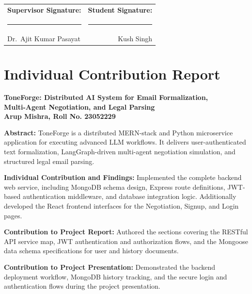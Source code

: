 \documentclass[12pt,a4paper]{report}
\begin{document}
\vspace{2cm}
\noindent
\begin{tabular*}{\textwidth}{@{\extracolsep{\fill}}lr}
	\textbf{Supervisor Signature:} & \textbf{Student Signature:} \\[1.8cm]
	\rule{6cm}{0.4pt} & \rule{6cm}{0.4pt} \\
	Dr.\ Ajit Kumar Pasayat & Kush Singh \\
\end{tabular*}

\clearpage
\chapter*{Individual Contribution Report}
\begin{center}
	{\large \textbf{ToneForge: Distributed AI System for Email Formalization,\\Multi-Agent Negotiation, and Legal Parsing}}\\[0.5cm]
	{\large \textbf{Arup Mishra, Roll No. 23052229}}\\[0.2cm]
\end{center}

\vspace{0.5cm}
\noindent \textbf{Abstract:}
ToneForge is a distributed MERN-stack and Python microservice application for executing advanced LLM workflows. It delivers user-authenticated text formalization, LangGraph-driven multi-agent negotiation simulation, and structured legal email parsing.

\vspace{0.5cm}
\noindent \textbf{Individual Contribution and Findings:}
Implemented the complete backend web service, including MongoDB schema design, Express route definitions, JWT-based authentication middleware, and database integration logic. Additionally developed the React frontend interfaces for the Negotiation, Signup, and Login pages.

\vspace{0.5cm}
\noindent \textbf{Contribution to Project Report:}
Authored the sections covering the RESTful API service map, JWT authentication and authorization flows, and the Mongoose data schema specifications for user and history documents.

\vspace{0.5cm}
\noindent \textbf{Contribution to Project Presentation:}
Demonstrated the backend deployment workflow, MongoDB history tracking, and the secure login and authentication flows during the project presentation.
\end{document}
